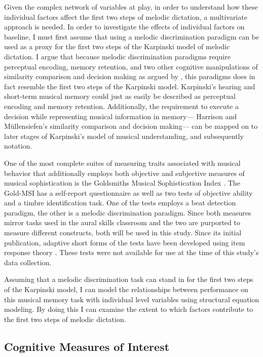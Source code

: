 \documentclass[12pt,]{book}
\begin{document}
Given the complex network of variables at play, in order to understand how these individual factors affect the first two steps of melodic dictation, a multivariate approach is needed.
In order to investigate the effects of individual factors on baseline, I must first assume that using a melodic discrimination paradigm can be used as a proxy for the first two steps of the Karpinski model of melodic dictation.
I argue that because melodic discrimination paradigms require perceptual encoding, memory retention, and two other cognitive manipulations of similarity comparison and decision making as argued by \citet{harrisonModellingMelodicDiscrimination2016}, this paradigms does in fact resemble the first two steps of the Karpinski model.
Karpinski's hearing and short-term musical memory could just as easily be described as perceptual encoding and memory retention.
Additionally, the requirement to execute a decision while representing musical information in memory--- Harrison and Müllensiefen's similarity comparison and decision making--- can be mapped on to later stages of Karpinski's model of musical understanding, and subsequently notation.

One of the most complete suites of measuring traits associated with musical behavior that additionally employs both objective and subjective measures of musical sophistication is the Goldsmiths Musical Sophistication Index \citep{mullensiefenMusicalityNonMusiciansIndex2014}.
The Gold-MSI has a self-report questionnaire as well as two tests of objective ability and a timbre identification task.
One of the tests employs a beat detection paradigm, the other is a melodic discrimination paradigm.
Since both measures mirror tasks used in the aural skills classroom and the two are purported to measure different constructs, both will be used in this study.
Since its initial publication, adaptive short forms of the tests have been developed using item response theory \citep{harrisonApplyingModernPsychometric2017a}.
These tests were not available for use at the time of this study's data collection.

Assuming that a melodic discrimination task can stand in for the first two steps of the Karpinski model, I can model the relationships between performance on this musical memory task with individual level variables using structural equation modeling.
By doing this I can examine the extent to which factors contribute to the first two steps of melodic dictation.

\hypertarget{cognitive-measures-of-interest}{%
\subsection{Cognitive Measures of Interest}\label{cognitive-measures-of-interest}}
\end{document}
